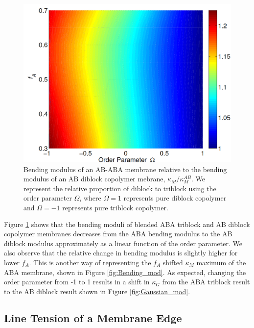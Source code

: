 \documentclass[twocolumn,aps,floatfix,nobibnotes]{revtex4-1}
\begin{document}
\begin{figure}[htp]
\centering
\includegraphics[width=1.0\columnwidth]{mumix_heatmap}
\caption{Bending modulus of an AB-ABA  membrane relative to the bending modulus of an AB diblock copolymer mebrane, $\kappa_M/\kappa_M^{AB}$. We represent the relative proportion of diblock to triblock using the order parameter $\Omega$, where $\Omega = 1$ represents pure diblock copolymer and $\Omega = -1$ represents pure triblock copolymer.}
\label{fig:mu_mix}
\centering
\end{figure}

Figure \ref{fig:mu_mix} shows that the bending moduli of blended ABA triblock and AB diblock copolymer membranes    decreases from the ABA bending modulus to the AB diblock modulus approximately as a linear function of the order parameter. We also observe that the relative change in bending modulus is slightly higher for lower $f_A$. This is another way of representing the $f_A$ shifted $\kappa_M$ maximum of the ABA membrane, shown in Figure \ref{fig:Bending_mod}. As expected, changing the order parameter from -1 to 1 results in a shift in $\kappa_G$ from the ABA triblock result to the AB diblock result shown in Figure \ref{fig:Gaussian_mod}.

\subsection{Line Tension of a Membrane Edge}
\end{document}
